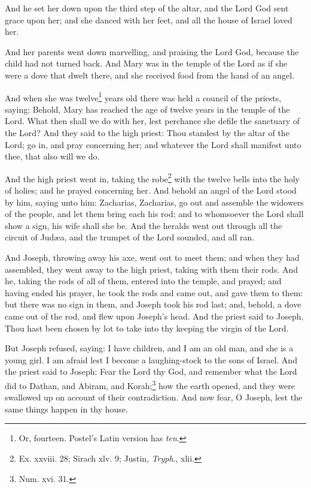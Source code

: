 \pend\pstart
And he set her down upon the third step of the altar, and the Lord God sent grace upon her; and she danced with her feet, and all the house of Israel loved her.

\pend\pstart
{}

\pend\pstart
And her parents went down marvelling, and praising the Lord God, because the child had not turned back. And Mary was in the temple of the Lord as if she were a dove that dwelt there, and she received food from the hand of an angel.

\pend\pstart
And when she was twelve\footnote{Or, fourteen. Postel's Latin version has \textit{ten}.} years old there was held a council of the priests, saying: Behold, Mary has reached the age of twelve years in the temple of the Lord. What then shall we do with her, lest perchance she defile the sanctuary of the Lord? And they said to the high priest: Thou standest by the altar of the Lord; go in, and pray concerning her; and whatever the Lord shall manifest unto thee, that also will we do.

\pend\pstart
And the high priest went in, taking the robe\footnote{Ex. xxviii. 28; Sirach xlv. 9; Justin, \textit{Tryph}., xlii.} with the twelve bells into the holy of holies; and he prayed concerning her. And behold an angel of the Lord stood by him, saying unto him: Zacharias, Zacharias, go out and assemble the widowers of the people, and let them bring each his rod; and to whomsoever the Lord shall show a sign, his wife shall she be. And the heralds went out through all the circuit of Judæa, and the trumpet of the Lord sounded, and all ran.

\pend\pstart
{}

\pend\pstart
And Joseph, throwing away his axe, went out to meet them; and when they had assembled, they went away to the high priest, taking with them their rods. And he, taking the rods of all of them, entered into the temple, and prayed; and having ended his prayer, he took the rods and came out, and gave them to them: but there was no sign in them, and Joseph took his rod last; and, behold, a dove came out of the rod, and flew upon Joseph's head. And the priest said to Joseph, Thou hast been chosen by lot to take into thy keeping the virgin of the Lord.

\pend\pstart
But Joseph refused, saying: I have children, and I am an old man, and she is a young girl. I am afraid lest I become a laughing-stock to the sons of Israel. And the priest said to Joseph: Fear the Lord thy God, and remember what the Lord did to Dathan, and Abiram, and Korah;\footnote{Num. xvi. 31.} how the earth opened, and they were swallowed up on account of their contradiction. And now fear, O Joseph, lest the same things happen in thy house.

